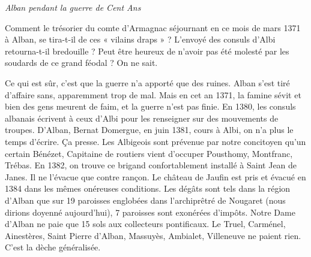 
\begin{center}
    {\Large\itshape Alban pendant la guerre de Cent Ans}
\end{center}

\vspace{1.5em}

\noindent
Comment le trésorier du comte d'Armagnac séjournant en ce mois de mars 1371 à Alban,
se tira-t-il de ces « vilains draps » ? L'envoyé des consuls d'Albi retourna-t-il
bredouille ? Peut être heureux de n'avoir pas été molesté par les soudards de ce
grand féodal ? On ne sait.

\medskip

\noindent
Ce qui est sûr, c'est que la guerre n'a apporté que des ruines. Alban s'est tiré
d'affaire sans, apparemment trop de mal. Mais en cet an 1371, la famine sévit et
bien des gens meurent de faim, et la guerre n'est pas finie. En 1380, les consuls
albanais écrivent à ceux d'Albi pour les renseigner sur des mouvements de troupes.
D'Alban, Bernat Domergue, en juin 1381, cours à Albi, on n'a plus le temps d'écrire.
Ça presse. Les Albigeois sont prévenue par notre concitoyen qu'un certain Bénézet,
Capitaine de routiers vient d'occuper Pousthomy, Montfranc, Trébas. En 1382, on
trouve ce brigand confortablement installé à Saint Jean de Janes. Il ne l'évacue
que contre rançon. Le château de Jaufin est pris et évacué en 1384 dans les mêmes
onéreuses conditions. Les dégâts sont tels dans la région d'Alban que sur
19 paroisses englobées dans l'archiprêtré de Nougaret (nous dirions doyenné
aujourd'hui), 7 paroisses sont exonérées d'impôts. Notre Dame d'Alban ne paie que
15 sols aux collecteurs pontificaux. Le Truel, Carménel, Ainestères, Saint Pierre
d'Alban, Massuyès, Ambialet, Villeneuve ne paient rien. C'est la dèche généralisée.

